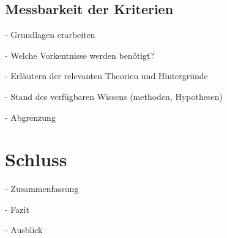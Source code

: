 \subsection{Messbarkeit der Kriterien}
- Grundlagen erarbeiten

- Welche Vorkentnisse werden benötigt?

- Erläutern der relevanten Theorien und Hintergründe

- Stand des verfügbaren Wissens (methoden, Hypothesen)

- Abgrenzung


\section{Schluss}

- Zusammenfassung

- Fazit

- Ausblick
